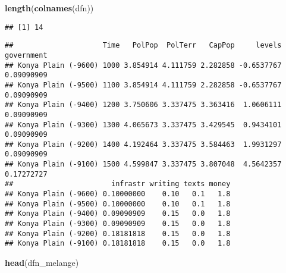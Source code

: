 \documentclass[
]{article}
\newenvironment{Shaded}{\begin{snugshade}}{\end{snugshade}}
\newcommand{\DataTypeTok}[1]{\textcolor[rgb]{0.13,0.29,0.53}{#1}}
\newcommand{\KeywordTok}[1]{\textcolor[rgb]{0.13,0.29,0.53}{\textbf{#1}}}
\newcommand{\NormalTok}[1]{#1}
\newcommand{\OperatorTok}[1]{\textcolor[rgb]{0.81,0.36,0.00}{\textbf{#1}}}
\newcommand{\StringTok}[1]{\textcolor[rgb]{0.31,0.60,0.02}{#1}}
\begin{document}
\begin{Shaded}
\begin{Highlighting}[]
\KeywordTok{length}\NormalTok{(}\KeywordTok{colnames}\NormalTok{(dfn))}
\end{Highlighting}
\end{Shaded}

\begin{verbatim}
## [1] 14
\end{verbatim}

\begin{Shaded}
\end{Shaded}

\begin{verbatim}
##                     Time   PolPop  PolTerr   CapPop     levels government
## Konya Plain (-9600) 1000 3.854914 4.111759 2.282858 -0.6537767 0.09090909
## Konya Plain (-9500) 1100 3.854914 4.111759 2.282858 -0.6537767 0.09090909
## Konya Plain (-9400) 1200 3.750606 3.337475 3.363416  1.0606111 0.09090909
## Konya Plain (-9300) 1300 4.065673 3.337475 3.429545  0.9434101 0.09090909
## Konya Plain (-9200) 1400 4.192464 3.337475 3.584463  1.9931297 0.09090909
## Konya Plain (-9100) 1500 4.599847 3.337475 3.807048  4.5642357 0.17272727
##                       infrastr writing texts money
## Konya Plain (-9600) 0.10000000    0.10   0.1   1.8
## Konya Plain (-9500) 0.10000000    0.10   0.1   1.8
## Konya Plain (-9400) 0.09090909    0.15   0.0   1.8
## Konya Plain (-9300) 0.09090909    0.15   0.0   1.8
## Konya Plain (-9200) 0.18181818    0.15   0.0   1.8
## Konya Plain (-9100) 0.18181818    0.15   0.0   1.8
\end{verbatim}

\begin{Shaded}
\begin{Highlighting}[]
\KeywordTok{head}\NormalTok{(dfn_melange)}
\end{Highlighting}
\end{Shaded}
\end{document}

